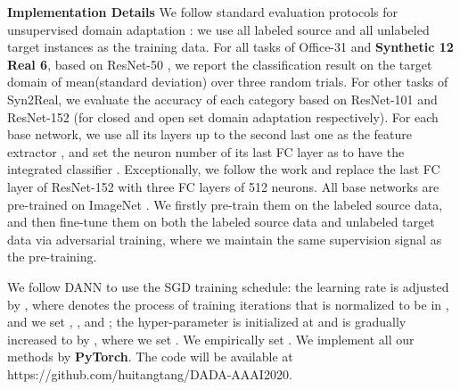 \documentclass[letterpaper]{article} \usepackage{aaai20}  \usepackage{times}  \usepackage{helvet} \usepackage{courier}  \usepackage[hyphens]{url}  \usepackage{graphicx} \urlstyle{rm} \def\UrlFont{\rm}  \usepackage{graphicx}  \frenchspacing  \setlength{\pdfpagewidth}{8.5in}  \setlength{\pdfpageheight}{11in}
\begin{document}
\noindent\textbf{Implementation Details} We follow standard evaluation protocols for unsupervised domain adaptation \cite{dann,tada}: we use all labeled source and all unlabeled target instances as the training data. For all tasks of Office-31 and \textbf{Synthetic 12}  \textbf{Real 6}, based on ResNet-50 \cite{resnet}, we report the classification result on the target domain of mean(standard deviation) over three random trials. For other tasks of Syn2Real, we evaluate the accuracy of each category based on ResNet-101 and ResNet-152 (for closed and open set domain adaptation respectively). For each base network, we use all its layers up to the second last one as the feature extractor , and set the neuron number of its last FC layer as  to have the integrated classifier . Exceptionally, we follow the work \cite{visda} and replace the last FC layer of ResNet-152 with three FC layers of 512 neurons. All base networks are pre-trained on ImageNet \cite{imagenet}. We firstly pre-train them on the labeled source data, and then fine-tune them on both the labeled source data and unlabeled target data via adversarial training, where we maintain the same supervision signal as the pre-training. 

We follow DANN \cite{dann} to use the SGD training schedule: the learning rate is adjusted by , where  denotes the process of training iterations that is normalized to be in , and we set , , and ; the hyper-parameter  is initialized at  and is gradually increased to  by , where we set . We empirically set . We implement all our methods by \textbf{PyTorch}. The code will be available at https://github.com/huitangtang/DADA-AAAI2020.
\end{document}
